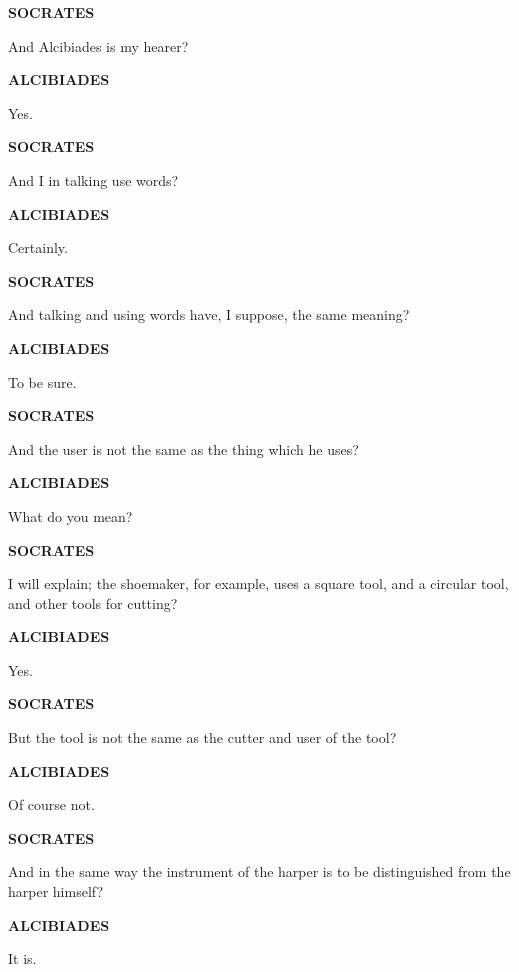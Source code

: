 \documentclass[11pt,letter]{article}
\begin{document}
\par \textbf{SOCRATES}
\par   And Alcibiades is my hearer?

\par \textbf{ALCIBIADES}
\par   Yes.

\par \textbf{SOCRATES}
\par   And I in talking use words?

\par \textbf{ALCIBIADES}
\par   Certainly.

\par \textbf{SOCRATES}
\par   And talking and using words have, I suppose, the same meaning?

\par \textbf{ALCIBIADES}
\par   To be sure.

\par \textbf{SOCRATES}
\par   And the user is not the same as the thing which he uses?

\par \textbf{ALCIBIADES}
\par   What do you mean?

\par \textbf{SOCRATES}
\par   I will explain; the shoemaker, for example, uses a square tool, and a circular tool, and other tools for cutting?

\par \textbf{ALCIBIADES}
\par   Yes.

\par \textbf{SOCRATES}
\par   But the tool is not the same as the cutter and user of the tool?

\par \textbf{ALCIBIADES}
\par   Of course not.

\par \textbf{SOCRATES}
\par   And in the same way the instrument of the harper is to be distinguished from the harper himself?

\par \textbf{ALCIBIADES}
\par   It is.
\end{document}
